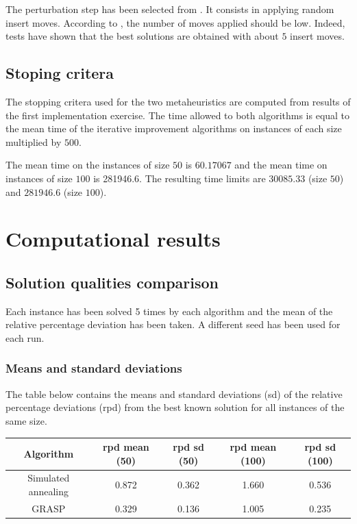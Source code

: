 \documentclass{article}
\begin{document}
The perturbation step has been selected from \cite{ref}.
It consists in applying random insert moves.
According to \cite{ref}, the number of moves applied should be low.
Indeed, tests have shown that the best solutions are obtained with about $5$ insert moves.

\subsection{Stoping critera}

The stopping critera used for the two metaheuristics are computed from results of the first implementation exercise.
The time allowed to both algorithms is equal to the mean time of the iterative improvement algorithms on instances of each size multiplied by $500$.\newline

The mean time on the instances of size $50$ is $60.17067$ and the mean time on instances of size $100$ is 281946.6.
The resulting time limits are $30085.33$ (size $50$) and $281946.6$ (size $100$).


\section{Computational results}

\subsection{Solution qualities comparison}

Each instance has been solved 5 times by each algorithm and the mean of the relative percentage deviation has been taken.
A different seed has been used for each run.

\subsubsection{Means and standard deviations}

The table below contains the means and standard deviations (sd) of the relative percentage deviations (rpd) from the best known solution for all instances of the same size.\newline

\begin{tabular} {|c|c|c|c|c|}
    \hline
    Algorithm & rpd mean (50) & rpd sd (50) & rpd mean (100) & rpd sd (100) \\
    \hline
    Simulated annealing & 0.872 & 0.362 & 1.660 & 0.536 \\
    \hline
    GRASP & 0.329 & 0.136 & 1.005 & 0.235 \\
    \hline
\end{tabular}
\end{document}
